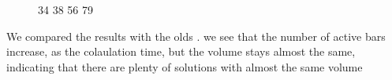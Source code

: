 \begin{figure}[]
    \hfill
    \hfill
    \hfill
    \caption{ 34 38 56 79}
    \label{fig:04_tto_slend}
\end{figure}

We compared the results with the olds . we see that the number of active bars increase, as the colaulation time, but the volume stays almost the same, indicating that there are plenty of solutions with almost the same volume


